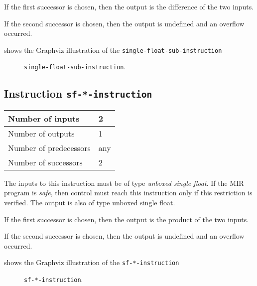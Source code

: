If the first successor is chosen, then the output is
the difference of the two inputs.  

If the second successor is chosen, then the output is undefined and an
overflow occurred. 

 shows the Graphviz illustration of the
\texttt{single-float-sub-instruction}

\begin{figure}
\begin{center}
\end{center}
\caption{\label{fig-single-float-sub-instruction}
\texttt{single-float-sub-instruction}.}
\end{figure}

\subsection{Instruction \texttt{sf-*-instruction}}
\label{mir-instruction-sf-*}

\begin{tabular}{|l|l|}
\hline
Number of inputs & 2\\
\hline
Number of outputs & 1\\
\hline
Number of predecessors & any\\
\hline
Number of successors & 2\\
\hline
\end{tabular}

The inputs to this instruction must be of type \emph{unboxed single
  float}.  If the MIR program is \emph{safe}, then control must reach
this instruction only if this restriction is verified.  The output is
also of type unboxed single float.

If the first successor is chosen, then the output is
the product of the two inputs.  

If the second successor is chosen, then the output is undefined and an
overflow occurred. 

 shows the Graphviz illustration of the
\texttt{sf-*-instruction}

\begin{figure}
\begin{center}
\end{center}
\caption{\label{fig-sf-*-instruction}
\texttt{sf-*-instruction}.}
\end{figure}


